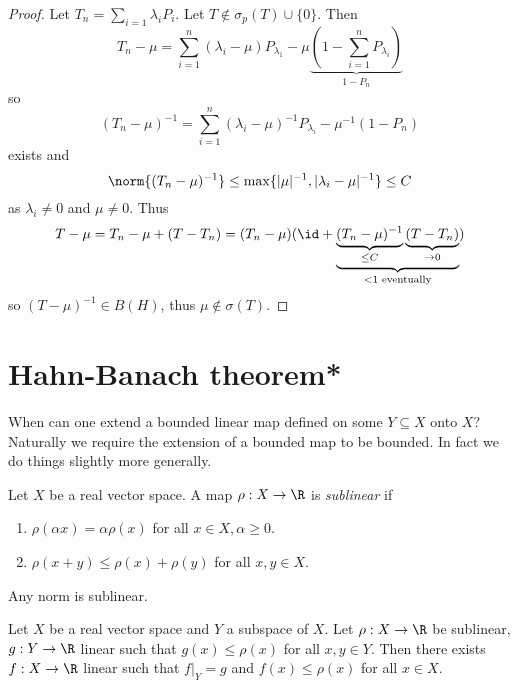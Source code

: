 \documentclass[a4paper]{article}
\begin{document}
\begin{proof}
  Let \(T_n = \sum_{i = 1} \lambda_iP_i\). Let \(T \notin \sigma_p(T) \cup \{0\}\). Then
  \[
    T_n - \mu
    = \sum_{i = 1}^n (\lambda_i - \mu) P_{\lambda_1} - \mu \underbrace{(1 - \sum_{i = 1}^n P_{\lambda_i})}_{1 - P_n}
  \]
  so
  \[
    (T_n - \mu)^{-1} = \sum_{i = 1}^n (\lambda_i - \mu)^{-1} P_{\lambda_i} - \mu^{-1} (1 - P_n)
  \]
  exists and
  \[
    \norm{(T_n - \mu)^{-1}} \leq \max \{|\mu|^{-1}, |\lambda_i - \mu|^{-1}\} \leq C
  \]
  as \(\lambda_i \neq 0\) and \(\mu \neq 0\). Thus
  \[
    T - \mu
    = T_n - \mu + (T - T_n)
    = (T_n - \mu) (\id + \underbrace{\underbrace{(T_n - \mu)^{-1}}_{\leq C} \underbrace{(T - T_n)}_{\to 0}}_{< 1 \text{ eventually}})
  \]
  so \((T - \mu)^{-1} \in B(H)\), thus \(\mu \notin \sigma(T)\).
\end{proof}






\section{Hahn-Banach theorem*}

When can one extend a bounded linear map defined on some \(Y \subseteq X\) onto \(X\)? Naturally we require the extension of a bounded map to be bounded. In fact we do things slightly more generally.

\begin{definition}
  Let \(X\) be a real vector space. A map \(\rho: X \to \R\) is \emph{sublinear} if
  \begin{enumerate}
  \item \(\rho(\alpha x) = \alpha \rho(x)\) for all \(x \in X, \alpha \geq 0\).
  \item \(\rho(x + y) \leq \rho(x) + \rho(y)\) for all \(x, y \in X\).
  \end{enumerate}
\end{definition}

\begin{eg}
  Any norm is sublinear.
\end{eg}

\begin{theorem}
  \label{thm:Hahn-Banach}
  Let \(X\) be a real vector space and \(Y\) a subspace of \(X\). Let \(\rho: X \to \R\) be sublinear, \(g: Y \to \R\) linear such that \(g(x) \leq \rho(x)\) for all \(x, y \in Y\). Then there exists \(f: X \to \R\) linear such that \(f|_Y = g\) and \(f(x) \leq \rho(x)\) for all \(x \in X\).
\end{theorem}
\end{document}
